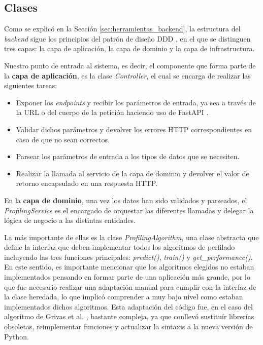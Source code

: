 \subsection{Clases}

\bigskip
Como se explicó en la Sección \ref{sec:herramientas_backend}, la estructura del \textit{backend} sigue los principios
del patrón de diseño DDD \cite{ddd}, en el que se distinguen tres capas: la capa de aplicación, la capa de dominio
y la capa de infrastructura.

\bigskip
Nuestro punto de entrada al sistema, es decir, el componente que forma parte de la \textbf{capa de aplicación}, es la clase
\textit{Controller}, el cual se encarga de realizar las siguientes tareas:

\begin{itemize}
	\item Exponer los \textit{endpoints} y recibir los parámetros de entrada, ya sea a través de la URL o del cuerpo de la petición
	haciendo uso de FastAPI \cite{fastapi}.
	\item Validar dichos parámetros y devolver los errores HTTP correspondientes en caso de que no sean correctos.
	\item Parsear los parámetros de entrada a los tipos de datos que se necesiten.
	\item Realizar la llamada al servicio de la capa de dominio y devolver el valor de retorno encapsulado en una respuesta HTTP.
\end{itemize}

\bigskip
En la \textbf{capa de dominio}, una vez los datos han sido validados y parseados, el \textit{ProfilingService} es el encargado de orquestar
las diferentes llamadas y delegar la lógica de negocio a las distintas entidades.

\bigskip
La más importante de ellas es la clase \textit{ProfilingAlgorithm},
una clase abstracta que define la interfaz que deben implementar todos los algoritmos de perfilado incluyendo las tres funciones principales:
\textit{predict()}, \textit{train()} y \textit{get\_performance()}. En este sentido, es importante mencionar que los algoritmos elegidos no estaban implementados
pensando en formar parte de una aplicación más grande, por lo que fue necesario realizar una adaptación manual para cumplir con la interfaz de
la clase heredada, lo que implicó comprender a muy bajo nivel como estaban implementados dichos algoritmos. Esta adaptación del código fue, en el caso del algoritmo de Grivas et al. \cite{grivas2015author}, 
bastante compleja, ya que conllevó sustituír librerías obsoletas, reimplementar funciones y actualizar la sintaxis a la nueva versión de Python.

